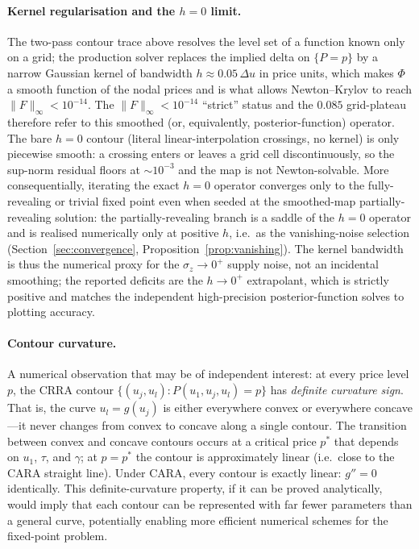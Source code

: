 \documentclass[12pt,letterpaper]{article}
\theoremstyle{definition}
\theoremstyle{remark}
\newcommand{\1}{\mathbf{1}}
\begin{document}
\paragraph{Kernel regularisation and the $h=0$ limit.}
The two-pass contour trace above resolves the level set of a function known
only on a grid; the production solver replaces the implied delta on
$\{P=p\}$ by a narrow Gaussian kernel of bandwidth
$h\!\approx\!0.05\,\Delta u$ in price units, which makes $\Phi$ a smooth
function of the nodal prices and is what allows Newton--Krylov to reach
$\|F\|_{\infty}<10^{-14}$. The $\|F\|_{\infty}<10^{-14}$ ``strict'' status
and the $0.085$ grid-plateau therefore refer to this smoothed (or,
equivalently, posterior-function) operator. The bare $h=0$ contour
(literal linear-interpolation crossings, no kernel) is only piecewise
smooth: a crossing enters or leaves a grid cell discontinuously, so the
sup-norm residual floors at $\sim10^{-3}$ and the map is not
Newton-solvable. More consequentially, iterating the exact $h=0$ operator
converges only to the fully-revealing or trivial fixed point even when
seeded at the smoothed-map partially-revealing solution: the
partially-revealing branch is a saddle of the $h=0$ operator and is
realised numerically only at positive $h$, i.e.\ as the vanishing-noise
selection (Section~\ref{sec:convergence}, Proposition~\ref{prop:vanishing}).
The kernel bandwidth is thus the numerical proxy for the
$\sigma_{z}\!\to\!0^{+}$ supply noise, not an incidental smoothing; the
reported deficits are the $h\to0^{+}$ extrapolant, which is strictly
positive and matches the independent high-precision posterior-function
solves to plotting accuracy.

\paragraph{Contour curvature.}
A numerical observation that may be of independent interest: at every
price level $p$, the CRRA contour $\{(u_j,u_l):P(u_1,u_j,u_l)=p\}$
has \emph{definite curvature sign}.  That is, the curve $u_l=g(u_j)$
is either everywhere convex or everywhere concave---it never changes
from convex to concave along a single contour.  The transition between
convex and concave contours occurs at a critical price $p^{*}$ that
depends on $u_1$, $\tau$, and $\gamma$; at $p=p^{*}$ the contour is
approximately linear (i.e.\ close to the CARA straight line).  Under
CARA, every contour is exactly linear: $g''=0$ identically.  This
definite-curvature property, if it can be proved analytically, would
imply that each contour can be represented with far fewer parameters
than a general curve, potentially enabling more efficient numerical
schemes for the fixed-point problem.
\end{document}
